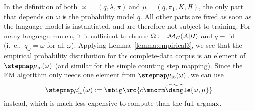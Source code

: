 In the definition of both $\varkappa=(q,\lambda,\pi)$ and $\mu=(q,\pi_1,K,H)$,
the only part that depends on $\omega$ is the probability model $q$. All other
parts are fixed as soon as the language model is instantiated, and are
therefore not subject to training. For many language models, it is sufficient
to choose $\Omega := \mathcal M_C(A|B)$ and $q = \operatorname{id}$ (i.~e.,~$q_\omega =
\omega$ for all $\omega$).  Applying Lemma~\ref{lemma:empirical3}, we see that
the empirical probability distribution for the complete-data corpus is an
element of $\stepmap\mu_\mathrm{io}(\omega)$ (and similar for the simple
counting step mapping). Since the EM algorithm only needs one element from
$\stepmap\mu_\mathrm{io}(\omega)$, we can use
\[
 \stepmap\mu'_\mathrm{io}(\omega) := \mbig\brc{ \widetilde{c\mnorm\dangle{\omega,\mu}} }
\]
instead, which is much less expensive to compute than the full $\argmax$.
